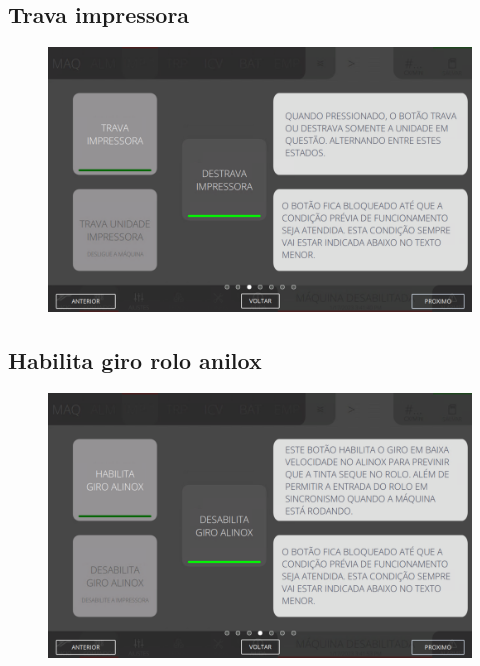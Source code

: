 \newpage
\thispagestyle{fancy}
\vspace*{40 pt}
\subsection{Trava impressora}
\vspace*{\fill}
\begin{figure}[h]
    \centering
    \includegraphics[width=576 px,height=360 px]{src/imagesICV/04-printters/02-printter/commands/3.png}
\end{figure}
\vspace*{\fill}

\newpage
\thispagestyle{fancy}
\vspace*{40 pt}
\subsection{Habilita giro rolo anilox}
\vspace*{\fill}
\begin{figure}[h]
    \centering
    \includegraphics[width=576 px,height=360 px]{src/imagesICV/04-printters/02-printter/commands/4.png}
\end{figure}
\vspace*{\fill}

